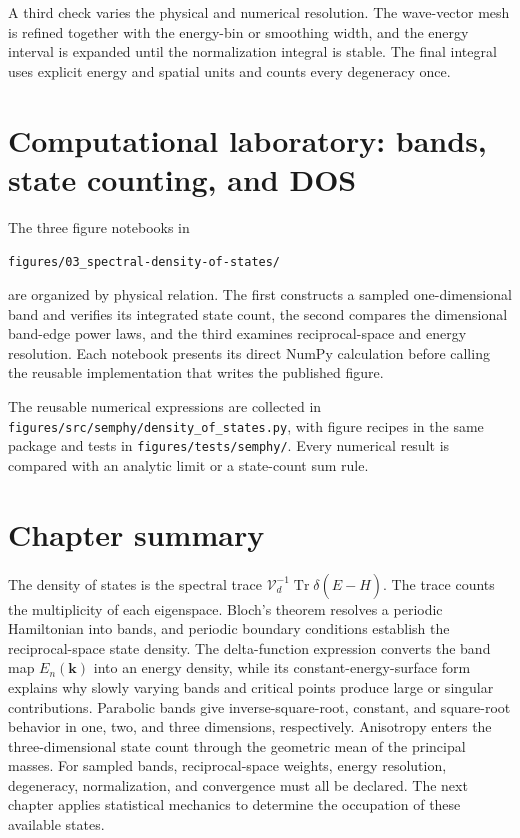 A third check varies the physical and numerical resolution.  The wave-vector
mesh is refined together with the energy-bin or smoothing width, and the energy
interval is expanded until the normalization integral is stable.  The final
integral uses explicit energy and spatial units and counts every degeneracy once.

\section{Computational laboratory: bands, state counting, and DOS}

The three figure notebooks in
\begin{center}
  \texttt{figures/03\_spectral-density-of-states/}
\end{center}
are organized by physical relation.  The first constructs a sampled
one-dimensional band and verifies its integrated state count, the second
compares the dimensional band-edge power laws, and the third examines
reciprocal-space and energy resolution.  Each notebook presents its direct
NumPy calculation before calling the reusable implementation that writes the
published figure.

The reusable numerical expressions are collected in
\texttt{figures/src/semphy/density\_of\_states.py}, with figure recipes in the
same package and tests in \texttt{figures/tests/semphy/}.  Every numerical
result is compared with an analytic limit or a state-count sum rule.

\section{Chapter summary}

The density of states is the spectral trace
$\mathcal V_d^{-1}\operatorname{Tr}\delta(E-\hat H)$.  The trace counts the
multiplicity of each eigenspace.  Bloch's theorem resolves a periodic
Hamiltonian into bands, and periodic boundary conditions establish the
reciprocal-space state density.  The delta-function expression converts the
band map $E_n(\bm k)$ into an energy density, while its constant-energy-surface
form explains why slowly varying bands and critical points produce large or
singular contributions.  Parabolic bands give inverse-square-root, constant,
and square-root behavior in one, two, and three dimensions, respectively.
Anisotropy enters the three-dimensional state count through the geometric mean
of the principal masses.  For sampled bands, reciprocal-space weights, energy
resolution, degeneracy, normalization, and convergence must all be declared.
The next chapter applies statistical mechanics to determine the occupation of
these available states.
